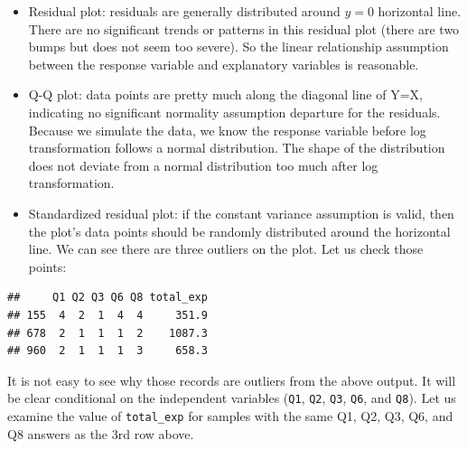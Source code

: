 \documentclass[12pt,]{krantz}
\makeatletter
\newenvironment{Shaded}{\begin{snugshade}}{\end{snugshade}}
\newcommand{\DecValTok}[1]{\textcolor[rgb]{0.06,0.06,0.06}{#1}}
\newcommand{\KeywordTok}[1]{\textcolor[rgb]{0.27,0.27,0.27}{\textbf{#1}}}
\newcommand{\NormalTok}[1]{#1}
\newcommand{\OperatorTok}[1]{\textcolor[rgb]{0.43,0.43,0.43}{\textbf{#1}}}
\newcommand{\StringTok}[1]{\textcolor[rgb]{0.5,0.5,0.5}{#1}}
\newenvironment{kframe}{%
\medskip{}
\setlength{\fboxsep}{.8em}
 \def\at@end@of@kframe{}%
 \ifinner\ifhmode%
  \def\at@end@of@kframe{\end{minipage}}%
  \begin{minipage}{\columnwidth}%
 \fi\fi%
 \def\FrameCommand##1{\hskip\@totalleftmargin \hskip-\fboxsep
 \colorbox{shadecolor}{##1}\hskip-\fboxsep
     \hskip-\linewidth \hskip-\@totalleftmargin \hskip\columnwidth}%
 \MakeFramed {\advance\hsize-\width
   \@totalleftmargin\z@ \linewidth\hsize
   \@setminipage}}%
 {\par\unskip\endMakeFramed%
 \at@end@of@kframe}
\renewenvironment{Shaded}{\begin{kframe}}{\end{kframe}}
\makeatother
\begin{document}
\begin{itemize}
\item
  Residual plot: residuals are generally distributed around \(y=0\) horizontal line. There are no significant trends or patterns in this residual plot (there are two bumps but does not seem too severe). So the linear relationship assumption between the response variable and explanatory variables is reasonable.
\item
  Q-Q plot: data points are pretty much along the diagonal line of Y=X, indicating no significant normality assumption departure for the residuals. Because we simulate the data, we know the response variable before log transformation follows a normal distribution. The shape of the distribution does not deviate from a normal distribution too much after log transformation.
\item
  Standardized residual plot: if the constant variance assumption is valid, then the plot's data points should be randomly distributed around the horizontal line. We can see there are three outliers on the plot. Let us check those points:
\end{itemize}

\begin{Shaded}
\end{Shaded}

\begin{verbatim}
##     Q1 Q2 Q3 Q6 Q8 total_exp
## 155  4  2  1  4  4     351.9
## 678  2  1  1  1  2    1087.3
## 960  2  1  1  1  3     658.3
\end{verbatim}

It is not easy to see why those records are outliers from the above output. It will be clear conditional on the independent variables (\texttt{Q1}, \texttt{Q2}, \texttt{Q3}, \texttt{Q6}, and \texttt{Q8}). Let us examine the value of \texttt{total\_exp} for samples with the same Q1, Q2, Q3, Q6, and Q8 answers as the 3rd row above.

\begin{Shaded}
\end{Shaded}
\end{document}
